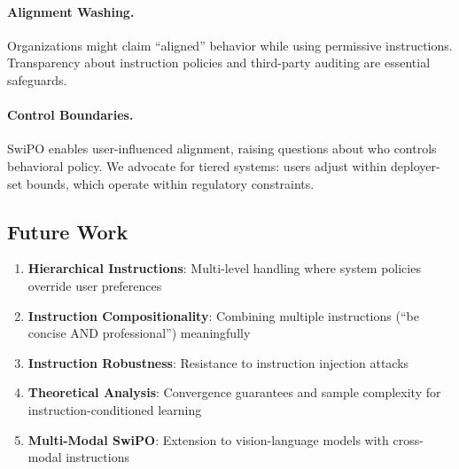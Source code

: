 \paragraph{Alignment Washing.} Organizations might claim ``aligned'' behavior while using permissive instructions. Transparency about instruction policies and third-party auditing are essential safeguards.

\paragraph{Control Boundaries.} SwiPO enables user-influenced alignment, raising questions about who controls behavioral policy. We advocate for tiered systems: users adjust within deployer-set bounds, which operate within regulatory constraints.


\vspace{-2mm}
\subsection{Future Work}
\label{sec:future_work}

\begin{enumerate}[leftmargin=*,itemsep=2pt]
    \item \textbf{Hierarchical Instructions}: Multi-level handling where system policies override user preferences

    \item \textbf{Instruction Compositionality}: Combining multiple instructions (``be concise AND professional'') meaningfully

    \item \textbf{Instruction Robustness}: Resistance to instruction injection attacks

    \item \textbf{Theoretical Analysis}: Convergence guarantees and sample complexity for instruction-conditioned learning

    \item \textbf{Multi-Modal SwiPO}: Extension to vision-language models with cross-modal instructions
\end{enumerate}
